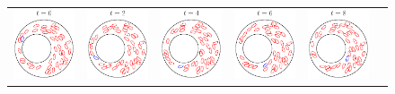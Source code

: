 \begin{figure}[htp]
\centering
\begin{tabular}{cccccc}
%
\includegraphics{figs/couette42SnapsTime1.pdf} &
\includegraphics{figs/couette42SnapsTime2.pdf} &
\includegraphics{figs/couette42SnapsTime3.pdf} &
\includegraphics{figs/couette42SnapsTime4.pdf} &
\includegraphics{figs/couette42SnapsTime5.pdf} &

\end{tabular}
\end{figure}
